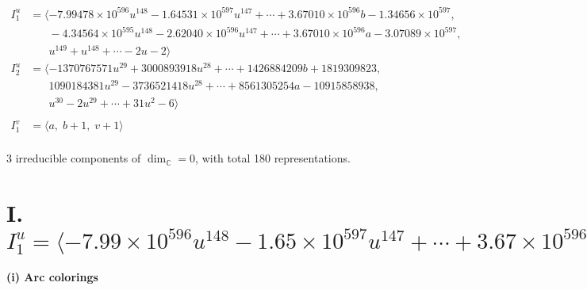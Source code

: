 \documentclass[1p]{elsarticle_modified}
\theoremstyle{definition}
\begin{document}
\begin{align*}
I^u_{1}&=\langle 
-7.99478\times10^{596} u^{148}-1.64531\times10^{597} u^{147}+\cdots+3.67010\times10^{596} b-1.34656\times10^{597},\\
\phantom{I^u_{1}}&\phantom{= \langle  }-4.34564\times10^{595} u^{148}-2.62040\times10^{596} u^{147}+\cdots+3.67010\times10^{596} a-3.07089\times10^{597},\\
\phantom{I^u_{1}}&\phantom{= \langle  }u^{149}+u^{148}+\cdots-2 u-2\rangle \\
I^u_{2}&=\langle 
-1370767571 u^{29}+3000893918 u^{28}+\cdots+1426884209 b+1819309823,\\
\phantom{I^u_{2}}&\phantom{= \langle  }1090184381 u^{29}-3736521418 u^{28}+\cdots+8561305254 a-10915858938,\\
\phantom{I^u_{2}}&\phantom{= \langle  }u^{30}-2 u^{29}+\cdots+31 u^2-6\rangle \\
\\
I^v_{1}&=\langle 
a,\;b+1,\;v+1\rangle \\
\end{align*}
\raggedright * 3 irreducible components of $\dim_{\mathbb{C}}=0$, with total 180 representations.\\
\newpage
\renewcommand{\arraystretch}{1}
\centering \section*{I. $I^u_{1}= \langle -7.99\times10^{596} u^{148}-1.65\times10^{597} u^{147}+\cdots+3.67\times10^{596} b-1.35\times10^{597},\;-4.35\times10^{595} u^{148}-2.62\times10^{596} u^{147}+\cdots+3.67\times10^{596} a-3.07\times10^{597},\;u^{149}+u^{148}+\cdots-2 u-2 \rangle$}
\flushleft \textbf{(i) Arc colorings}\\
\end{document}
